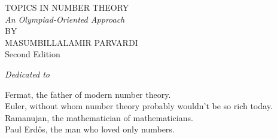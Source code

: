 \documentclass[leqno,12pt]{book}
\newcommand{\wb}[2]{\fontsize{#1}{#2}\usefont{U}{webo}{xl}{n}}
\begin{document}
\begin{titlepage}
	\centering
	\vspace*{2\baselineskip}
	{\ifxetex\fontsize{25}{10}\titlefont\fi TOPICS IN NUMBER THEORY}\\[2\baselineskip]
	\ifxetex
	\fi
	{\Large\itshape An Olympiad-Oriented Approach}\\[\baselineskip]
	{BY}\\[\baselineskip]
	{\ifxetex\fontsize{20}{10}\hspace{.5em}\titlefont\fi MASUM\hspace{.5em}BILLAL\hspace{2em}AMIR PARVARDI}\\[\baselineskip]
	\ifxetex
	\fi
	\vspace{.5in}
	{\Large Second Edition}\par
	\vfill
	\ifxetex
	\fi
	\vfill
\end{titlepage}

\begin{dedication}
	\begin{center}
		\textit{Dedicated to}
	\end{center}
	Fermat, the father of modern number theory.\\
	Euler, without whom number theory probably wouldn't be so rich today.\\
	Ramanujan, the mathematician of mathematicians.\\
	Paul Erd\H{o}s, the man who loved only numbers.
\end{dedication}
\end{document}

